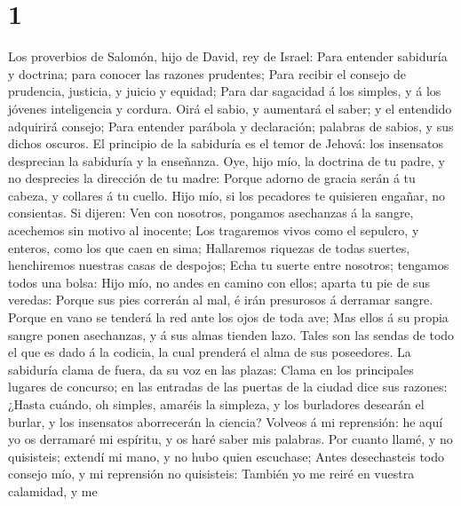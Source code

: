\hypertarget{section}{%
\section{1}\label{section}}

 Los proverbios de Salomón, hijo de David, rey de Israel:
 Para entender sabiduría y doctrina; para conocer las
razones prudentes;  Para recibir el consejo de prudencia,
justicia, y juicio y equidad;  Para dar sagacidad á los
simples, y á los jóvenes inteligencia y cordura.  Oirá el
sabio, y aumentará el saber; y el entendido adquirirá consejo;
 Para entender parábola y declaración; palabras de sabios, y
sus dichos oscuros.  El principio de la sabiduría es el
temor de Jehová: los insensatos desprecian la sabiduría y la enseñanza.
 Oye, hijo mío, la doctrina de tu padre, y no desprecies la
dirección de tu madre:  Porque adorno de gracia serán á tu
cabeza, y collares á tu cuello.  Hijo mío, si los pecadores
te quisieren engañar, no consientas.  Si dijeren: Ven con
nosotros, pongamos asechanzas á la sangre, acechemos sin motivo al
inocente;  Los tragaremos vivos como el sepulcro, y
enteros, como los que caen en sima;  Hallaremos riquezas de
todas suertes, henchiremos nuestras casas de despojos; 
Echa tu suerte entre nosotros; tengamos todos una bolsa: 
Hijo mío, no andes en camino con ellos; aparta tu pie de sus veredas:
 Porque sus pies correrán al mal, é irán presurosos á
derramar sangre.  Porque en vano se tenderá la red ante los
ojos de toda ave;  Mas ellos á su propia sangre ponen
asechanzas, y á sus almas tienden lazo.  Tales son las
sendas de todo el que es dado á la codicia, la cual prenderá el alma de
sus poseedores.  La sabiduría clama de fuera, da su voz en
las plazas:  Clama en los principales lugares de concurso;
en las entradas de las puertas de la ciudad dice sus razones:
 ¿Hasta cuándo, oh simples, amaréis la simpleza, y los
burladores desearán el burlar, y los insensatos aborrecerán la ciencia?
 Volveos á mi reprensión: he aquí yo os derramaré mi
espíritu, y os haré saber mis palabras.  Por cuanto llamé,
y no quisisteis; extendí mi mano, y no hubo quien escuchase;
 Antes desechasteis todo consejo mío, y mi reprensión no
quisisteis:  También yo me reiré en vuestra calamidad, y me
